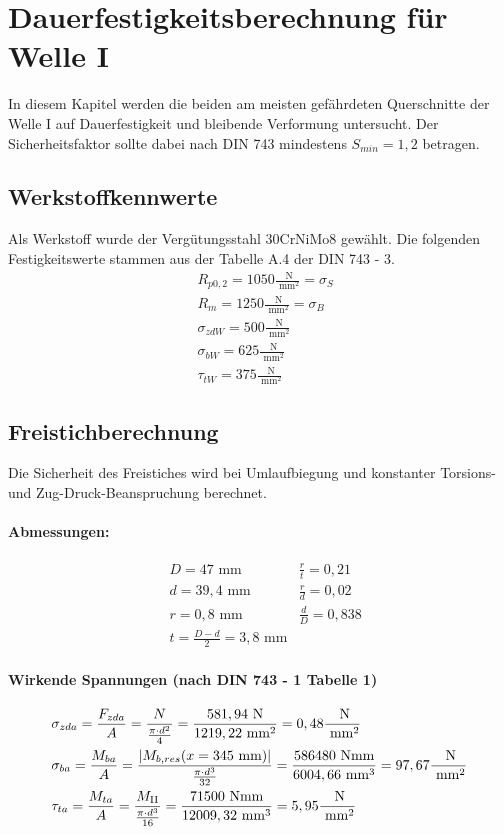 \chapter{Dauerfestigkeitsberechnung für Welle I}
In diesem Kapitel werden die beiden am meisten gefährdeten Querschnitte der Welle I auf Dauerfestigkeit und bleibende Verformung untersucht. Der Sicherheitsfaktor sollte dabei nach DIN 743 mindestens $S_{min} = 1,2$ betragen.
\section{Werkstoffkennwerte}
Als Werkstoff wurde der Vergütungsstahl 30CrNiMo8 gewählt. Die folgenden Festigkeitswerte stammen aus der Tabelle A.4 der DIN 743 - 3.
\begin{align*}
	&R_{p0,2} = 1050 \frac{\text{ N}}{\text{ mm}^2} = \sigma_S \\
	&R_{m} = 1250 \frac{\text{ N}}{\text{ mm}^2} = \sigma_B \\
	&\sigma_{zdW} = 500 \frac{\text{ N}}{\text{ mm}^2} \\
	&\sigma_{bW} = 625 \frac{\text{ N}}{\text{ mm}^2} \\
	&\tau_{tW} = 375 \frac{\text{ N}}{\text{ mm}^2} 
\end{align*}

\section{Freistichberechnung}
Die Sicherheit des Freistiches wird bei Umlaufbiegung und konstanter Torsions- und Zug-Druck-Beanspruchung berechnet.
\subsubsection{Abmessungen:}
\begin{align*}
	&D= 47 \text{ mm} & \frac{r}{t} = 0,21 \\
	&d= 39,4 \text{ mm} & \frac{r}{d} = 0,02 \\
	& r= 0,8 \text{ mm} & \frac{d}{D} = 0,838 \\
	& t= \frac{D-d}{2} = 3,8 \text{ mm} 
\end{align*}
\subsubsection{Wirkende Spannungen (nach DIN 743 - 1 Tabelle 1)}
\begin{align*}
	&\sigma_{zda} = \frac{F_{zda}}{A} = \frac{N}{\frac{\pi \cdot d^2}{4}} = \frac{581,94 \text{ N}}{1219,22 \text{ mm}^2} = 0,48 \frac{\text{ N}}{\text{ mm}^2} \\
	&\sigma_{ba} = \frac{M_{ba}}{A} = \frac{|M_{b,res}(x=345 \text{ mm}) |}{\frac{\pi \cdot d^3}{32}} = \frac{586480 \text{ Nmm}}{6004,66 \text{ mm}^3} = 97,67 \frac{\text{ N}}{\text{ mm}^2} \\
	&\tau_{ta} = \frac{M_{ta}}{A} = \frac{M_{\mathrm{II}}}{\frac{\pi \cdot d^3}{16}} = \frac{71500 \text{ Nmm}}{12009,32 \text{ mm}^3} = 5,95 \frac{\text{ N}}{\text{ mm}^2} 
\end{align*}
